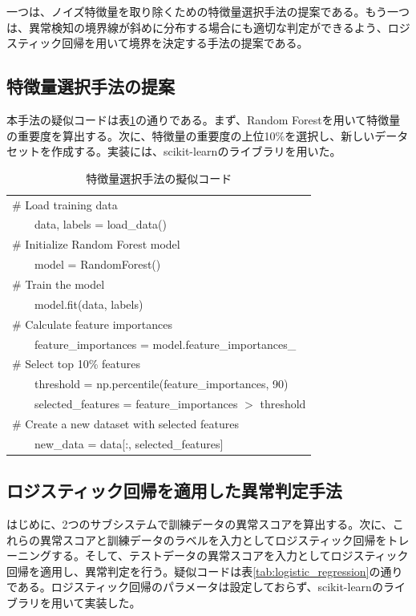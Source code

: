 \documentclass{css}
\begin{document}
一つは、ノイズ特徴量を取り除くための特徴量選択手法の提案である。もう一つは、異常検知の境界線が斜めに分布する場合にも適切な判定ができるよう、ロジスティック回帰を用いて境界を決定する手法の提案である。

\subsection{特徴量選択手法の提案}   
本手法の疑似コードは表\ref{tab:feature_selection}の通りである。まず、Random Forestを用いて特徴量の重要度を算出する。次に、特徴量の重要度の上位10\%を選択し、新しいデータセットを作成する。実装には、scikit-learnのライブラリを用いた\cite{scikit-learn}。

\begin{table}[h!]
    \centering
    \caption{特徴量選択手法の擬似コード}
    \begin{tabular}{|l|}
    \hline
    \# Load training data \\
       \ \ \ \ data, labels = load\_data() \\ 
    \# Initialize Random Forest model \\
       \ \ \ \ model = RandomForest() \\ 
    \# Train the model \\
       \ \ \ \ model.fit(data, labels) \\ 
    \# Calculate feature importances \\
       \ \ \ \ feature\_importances = model.feature\_importances\_ \\ 
    \# Select top 10\% features \\
       \ \ \ \ threshold = np.percentile(feature\_importances, 90) \\
       \ \ \ \ selected\_features = feature\_importances $>$ threshold \\ 
    \# Create a new dataset with selected features \\
       \ \ \ \ new\_data = data[:, selected\_features] \\ \hline
    \end{tabular}
    \label{tab:feature_selection}
\end{table}


\subsection{ロジスティック回帰を適用した異常判定手法}
はじめに、2つのサブシステムで訓練データの異常スコアを算出する。次に、これらの異常スコアと訓練データのラベルを入力としてロジスティック回帰をトレーニングする。そして、テストデータの異常スコアを入力としてロジスティック回帰を適用し、異常判定を行う。疑似コードは表\ref{tab:logistic_regression}の通りである。ロジスティック回帰のパラメータは設定しておらず、scikit-learnのライブラリを用いて実装した。
\end{document}
